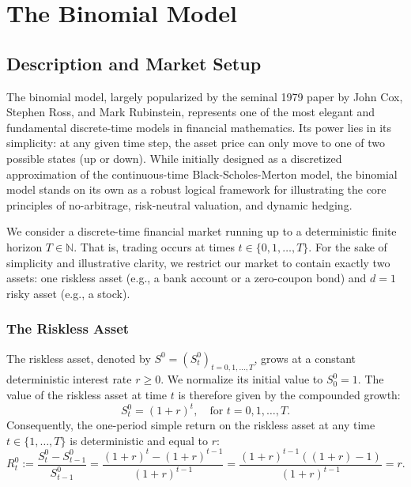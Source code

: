 \chapter{The Binomial Model}

\section{Description and Market Setup}

The binomial model, largely popularized by the seminal 1979 paper by John Cox, Stephen Ross, and Mark Rubinstein, represents one of the most elegant and fundamental discrete-time models in financial mathematics. Its power lies in its simplicity: at any given time step, the asset price can only move to one of two possible states (up or down). While initially designed as a discretized approximation of the continuous-time Black-Scholes-Merton model, the binomial model stands on its own as a robust logical framework for illustrating the core principles of no-arbitrage, risk-neutral valuation, and dynamic hedging.

We consider a discrete-time financial market running up to a deterministic finite horizon $T \in \mathbb{N}$. That is, trading occurs at times $t \in \{0, 1, \dots, T\}$. For the sake of simplicity and illustrative clarity, we restrict our market to contain exactly two assets: one riskless asset (e.g., a bank account or a zero-coupon bond) and $d=1$ risky asset (e.g., a stock).

\subsection{The Riskless Asset}
The riskless asset, denoted by $S^0 = (S^0_t)_{t=0,1,\dots,T}$, grows at a constant deterministic interest rate $r \geq 0$. We normalize its initial value to $S^0_0 = 1$. The value of the riskless asset at time $t$ is therefore given by the compounded growth:
\begin{equation}
    S^0_t = (1+r)^t, \quad \text{for } t = 0, 1, \dots, T.
\end{equation}
Consequently, the one-period simple return on the riskless asset at any time $t \in \{1, \dots, T\}$ is deterministic and equal to $r$:
\begin{equation}
    R^0_t := \frac{S^0_t - S^0_{t-1}}{S^0_{t-1}} = \frac{(1+r)^t - (1+r)^{t-1}}{(1+r)^{t-1}} = \frac{(1+r)^{t-1}((1+r) - 1)}{(1+r)^{t-1}} = r.
\end{equation}

